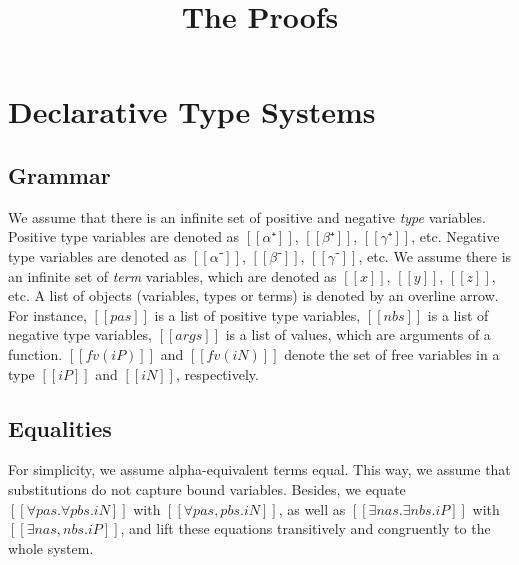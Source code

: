 \documentclass[acmsmall,natbib=false,review,anonymous]{acmart}
\begin{document}
\title{The Proofs}

\maketitle

\tableofcontents

\newpage

\section{Declarative Type Systems}

\subsection{Grammar}
We assume that there is an infinite set of positive and 
negative \emph{type} variables. Positive type variables are denoted as 
$[[α⁺]]$, $[[β⁺]]$, $[[γ⁺]]$, etc.
Negative type variables are denoted as $[[α⁻]]$, $[[β⁻]]$, $[[γ⁻]]$, etc.
We assume there is an infinite set of \emph{term} variables,
which are denoted as $[[x]]$, $[[y]]$, $[[z]]$, etc.
A list of objects (variables, types or terms) is denoted by
an overline arrow. For instance, $[[pas]]$ is a list of positive type variables, 
$[[nbs]]$ is a list of negative type variables, 
$[[args]]$ is a list of values, which are arguments of a function.
$[[fv(iP)]]$ and $[[fv(iN)]]$ denote the set of free variables 
in a type $[[iP]]$ and $[[iN]]$, respectively.

\bigskip


\begin{definition}
  \hfill
  \begin{multicols}{2}
    \ottgrammartabular{
      \ottiN\ottinterrule
    }

    \ottgrammartabular{
      \ottiP\ottinterrule
    }
    \columnbreak
  \end{multicols}
\end{definition}

\subsection{Equalities}
For simplicity, we assume alpha-equivalent terms equal.
This way, we assume that substitutions do not capture bound variables.
Besides, we equate
$[[∀pas.∀pbs.iN]]$ with $[[∀pas,pbs.iN]]$, 
as well as $[[∃nas.∃nbs.iP]]$ with $[[∃nas,nbs.iP]]$,
and lift these equations transitively and congruently 
to the whole system.
\end{document}
